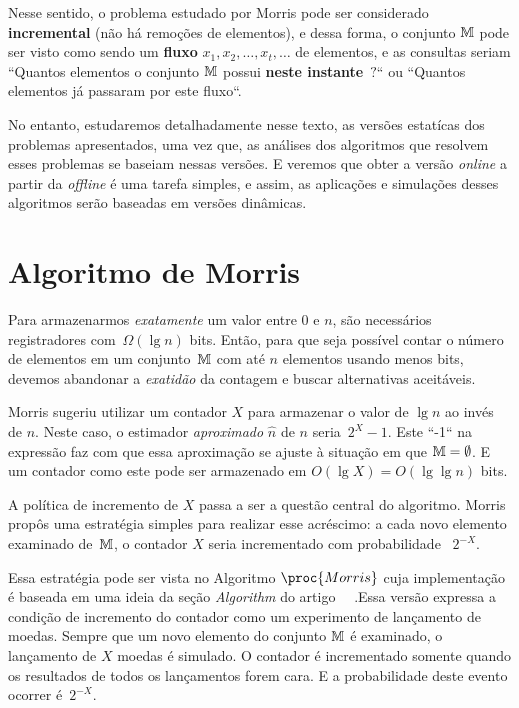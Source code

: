 Nesse sentido, o problema estudado por Morris pode ser considerado \textbf{incremental} (não há remoções de elementos), 
e dessa forma, o conjunto $\mathbb{M}$ pode ser visto como sendo um \textbf{fluxo} $x_1, x_2, \dots, x_t, \dots$ de elementos, 
e as consultas seriam ``Quantos elementos o conjunto $\mathbb{M}$ possui \textbf{neste instante}~$?$`` ou 
``Quantos elementos já passaram por este fluxo``.

No entanto, estudaremos detalhadamente nesse texto, as versões estatícas dos problemas apresentados, uma vez que, as 
análises dos algoritmos que resolvem esses problemas se baseiam nessas versões. E veremos que obter a versão 
\textit{online} a partir da \textit{offline} é uma tarefa simples, e assim, as aplicações e simulações desses algoritmos 
serão baseadas em versões dinâmicas.

\section{Algoritmo de Morris}

Para armazenarmos \textit{exatamente} um valor entre $0$ e $n$, são necessários registradores com~$\Omega(\lg n)$ bits. 
Então, para que seja possível contar o número de elementos em um conjunto~$\mathbb{M}$ com até $n$ elementos usando menos 
bits, devemos abandonar a \textit{exatidão} da contagem e buscar alternativas aceitáveis.

Morris sugeriu utilizar um contador $X$ para armazenar o valor de $\lg n$ ao invés de $n$. Neste caso, o estimador 
\textit{aproximado} $\hat{n}$ de $n$ seria~$2^{X} - 1$. Este ``-1`` na expressão faz com que essa aproximação se ajuste 
à situação em que $\mathbb{M} = \emptyset$. E um contador como este pode ser armazenado em $O(\lg X) = O(\lg \lg n)$ bits.

A política de incremento de $X$ passa a ser a questão central do algoritmo. Morris propôs uma estratégia simples para 
realizar esse acréscimo: a cada novo elemento examinado de~$\mathbb{M}$, o contador $X$ seria incrementado com probabilidade~ 
$2^{-X}$.

Essa estratégia pode ser vista no Algoritmo $\proc{Morris}$ cuja implementação é baseada em uma ideia da seção 
\textit{Algorithm} do artigo ~~\citep{ApproximateCountingAlgorithm}.Essa versão 
expressa a condição de incremento do contador como um experimento de lançamento de moedas. Sempre que um novo elemento 
do conjunto $\mathbb{M}$ é examinado, o lançamento de $X$ moedas é simulado. O contador é incrementado somente quando os 
resultados de todos os lançamentos forem cara. E a probabilidade deste evento ocorrer é~$2^{-X}$.

